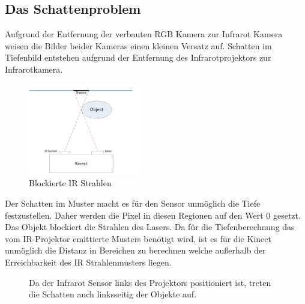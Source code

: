 \subsection{Das Schattenproblem}

Aufgrund der Entfernung der verbauten RGB Kamera zur Infrarot Kamera weisen die Bilder beider Kameras einen kleinen Versatz auf.
Schatten im Tiefenbild entstehen aufgrund der Entfernung des Infrarotprojektors zur Infrarotkamera.
\begin{figure}
  \vspace{-20pt}
  \begin{center}
       \includegraphics[height=4cm]{Res/Schatten_Strahl.png}
  \end{center}
  \vspace{-20pt}
  \caption{Blockierte IR Strahlen }
  \vspace{-10pt}
\end{figure}
Der Schatten im Muster macht es für den Sensor unmöglich die Tiefe festzustellen. Daher werden die Pixel in diesen Regionen auf den Wert 0 gesetzt.
Das Objekt blockiert die Strahlen des Lasers. Da für die Tiefenberechnung das vom IR-Projektor emittierte Musters benötigt wird, ist es für die Kinect unmöglich die Distanz in Bereichen zu berechnen welche außerhalb der Erreichbarkeit des IR Strahlenmusters liegen. \\








\begin{figure}[!ht]
  \centering
   \caption{Da der Infrarot Sensor links des Projektors positioniert ist, treten die Schatten auch linksseitig der Objekte auf.  }
\end{figure}




